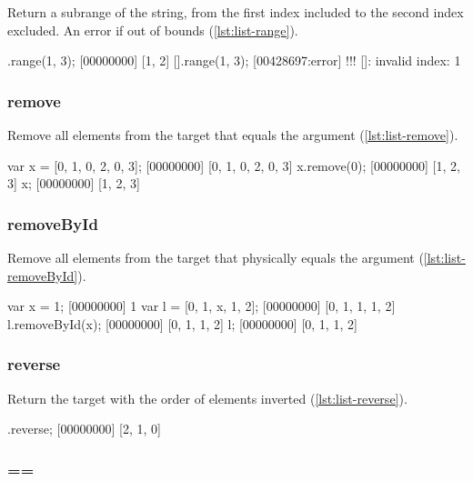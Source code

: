 Return a subrange of the string, from the first index included to the
second index excluded. An error if out of bounds (\autoref{lst:list-range}).

\begin{urbiscript}[caption=List.range, label=lst:list-range]
[0, 1, 2, 3].range(1, 3);
[00000000] [1, 2]
[].range(1, 3);
[00428697:error] !!! []: invalid index: 1
\end{urbiscript}


\subsubsection{remove}

Remove all elements from the target that equals the argument
(\autoref{lst:list-remove}).

\begin{urbiscript}[caption=List.remove, label=lst:list-remove]
var x = [0, 1, 0, 2, 0, 3];
[00000000] [0, 1, 0, 2, 0, 3]
x.remove(0);
[00000000] [1, 2, 3]
x;
[00000000] [1, 2, 3]
\end{urbiscript}

\subsubsection{removeById}

Remove all elements from the target that physically equals the
argument (\autoref{lst:list-removeById}).

\begin{urbiscript}[caption=List.removeById, label=lst:list-removeById]
var x = 1;
[00000000] 1
var l = [0, 1, x, 1, 2];
[00000000] [0, 1, 1, 1, 2]
l.removeById(x);
[00000000] [0, 1, 1, 2]
l;
[00000000] [0, 1, 1, 2]
\end{urbiscript}

\subsubsection{reverse}

Return the target with the order of elements inverted
(\autoref{lst:list-reverse}).

\begin{urbiscript}[caption=List.reverse, label=lst:list-reverse]
[0, 1, 2].reverse;
[00000000] [2, 1, 0]
\end{urbiscript}

\subsubsection{==}

